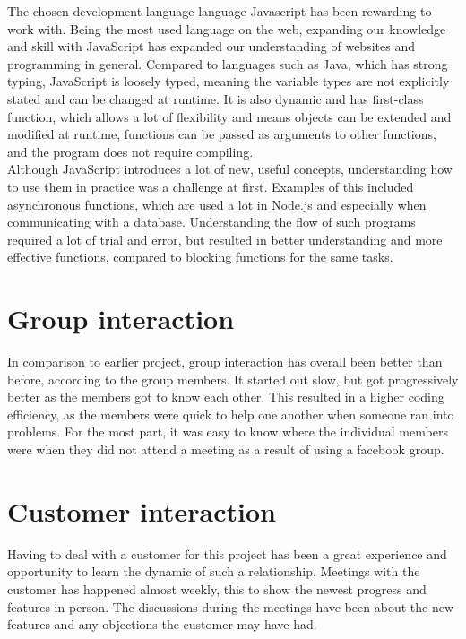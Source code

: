 The chosen development language language Javascript has been rewarding to work with. Being the most used language on the web, expanding our knowledge and skill with JavaScript has expanded our understanding of websites and programming in general. Compared to languages such as Java, which has strong typing, JavaScript is loosely typed, meaning the variable types are not explicitly stated and can be changed at runtime. It is also dynamic and has first-class function, which allows a lot of flexibility and means objects can be extended and modified at runtime, functions can be passed as arguments to other functions, and the program does not require compiling.\\
\newline
Although JavaScript introduces a lot of new, useful concepts, understanding how to use them in practice was a challenge at first. Examples of this included asynchronous functions, which are used a lot in Node.js and especially when communicating with a database. Understanding the flow of such programs required a lot of trial and error, but resulted in better understanding and more effective functions, compared to blocking functions for the same tasks.\\


\section{Group interaction}

In comparison to earlier project, group interaction has overall been better than before, according to the group members. It started out slow, but got progressively better as the members got to know each other. This resulted in a higher coding efficiency, as the members were quick to help one another when someone ran into problems. For the most part, it was easy to know where the individual members were when they did not attend a meeting as a result of using a facebook group.

\section{Customer interaction}

Having to deal with a customer for this project has been a great experience and opportunity to learn the dynamic of such a relationship. Meetings with the customer has happened almost weekly, this to show the newest progress and features in person. The discussions during the meetings have been about the new features and any objections the customer may have had. 

